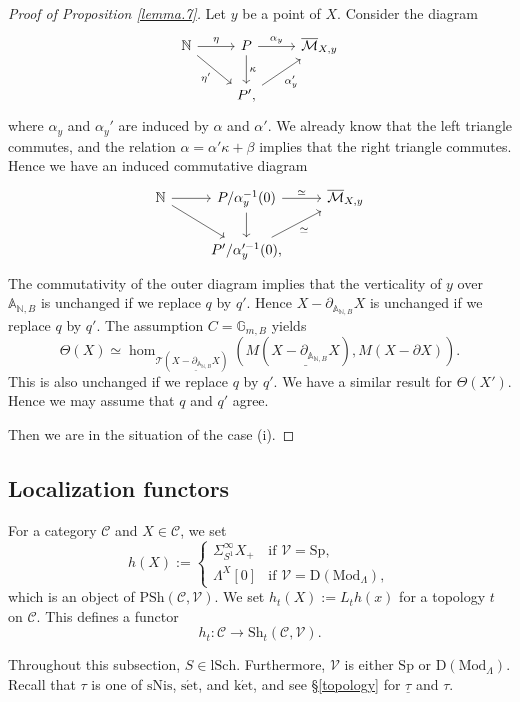 \documentclass[10pt]{amsart}
\theoremstyle{definition}
\theoremstyle{remark}
\numberwithin{equation}{subsection}
\newcommand{\A}{\mathbb{A}}
\newcommand{\G}{\mathbb{G}}
\newcommand{\N}{\mathbb{N}}
\newcommand{\cC}{\mathcal{C}}
\newcommand{\cM}{\mathcal{M}}
\newcommand{\cV}{\mathcal{V}}
\newcommand{\sT}{\mathscr{T}}
\newcommand{\ul}{\underline}
\newcommand{\ol}{\overline}
\newcommand{\Spt}{\mathrm{Sp}}
\newcommand{\DLambda}{\mathrm{D}(\mathrm{Mod}_{\Lambda})}
\newcommand{\lSch}{\mathrm{lSch}}
\newcommand{\infPsh}{\mathrm{PSh}}
\newcommand{\infShv}{\mathrm{Sh}}
\newcommand{\sNis}{\mathrm{sNis}}
\newcommand{\ketale}{\mathrm{k\acute{e}t}}
\newcommand{\setale}{\mathrm{s\acute{e}t}}
\begin{document}
\begin{proof}[Proof of Proposition \ref{lemma.7}]
Let $y$ be a point of $X$.
Consider the diagram
\[
\begin{tikzcd}
\N\ar[r,"\eta"]\ar[rd,"\eta'"']&
P\ar[r,"\alpha_y"]\ar[d,"\kappa"]&
\ol{\cM}_{X,y}
\\
&
P',\ar[ru,"\alpha_y'"']
\end{tikzcd}
\]
where $\alpha_y$ and $\alpha_y'$ are induced by $\alpha$ and $\alpha'$.
We already know that the left triangle commutes,
and the relation $\alpha=\alpha'\kappa+\beta$ implies that the right triangle commutes.
Hence we have an induced commutative diagram
\[
\begin{tikzcd}
\N\ar[r]\ar[rd]&
P/\alpha_y^{-1}(0)\ar[r,"\simeq"]\ar[d]&
\ol{\cM}_{X,y}
\\
&
P'/\alpha_y'^{-1}(0),\ar[ru,"\simeq"']
\end{tikzcd}
\]
The commutativity of the outer diagram implies that the verticality of $y$ over $\A_{\N,B}$ is unchanged if we replace $q$ by $q'$.
Hence
$X-\partial_{\A_{\N,B}} X$ is unchanged if we replace $q$ by $q'$.
The assumption $C=\G_{m,B}$
yields
\[
\Theta(X)
\simeq
\hom_{\sT(\ul{X-\partial_{\A_{\N,B}}X})}(M(\ul{X-\partial_{\A_{\N,B}}X}),M(X-\partial X)).
\]
This is also unchanged if we replace $q$ by $q'$.
We have a similar result for $\Theta(X')$.
Hence we may assume that $q$ and $q'$ agree.

Then we are in the situation of the case (i).
\end{proof}

\subsection{Localization functors}
\label{localization}



For a category $\cC$ and $X\in \cC$,
we set
\[
h(X)
:=
\left\{
\begin{array}{ll}
\Sigma_{S^1}^\infty X_+ & \text{if }\cV=\Spt,
\\
\Lambda^X[0] & \text{if }\cV=\DLambda,
\end{array}
\right.
\]
which is an object of $\infPsh(\cC,\cV)$.
We set $h_t(X):=L_t h(x)$ for a topology $t$ on $\cC$.
This defines a functor
\[
h_t\colon \cC \to \infShv_t(\cC,\cV).
\]


Throughout this subsection, $S\in \lSch$.
Furthermore, $\cV$ is either $\Spt$ or $\DLambda$.
Recall that $\tau$ is one of $\sNis$, $\setale$, and $\ketale$,
and see \S \ref{topology} for $\ul{\tau}$ and $\tau$.
\end{document}
